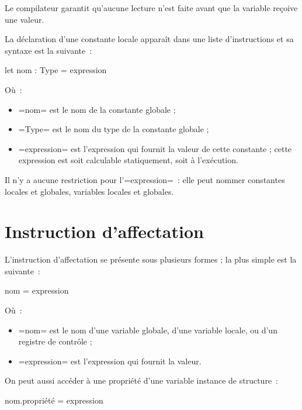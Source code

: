 Le compilateur garantit qu'aucune lecture n'est faite avant que la variable reçoive une valeur.











La déclaration d'une constante locale apparaît dans une liste d'instructions et sa syntaxe est la suivante~:

\begin{OMNIBUS}
let nom : Type = expression
\end{OMNIBUS}

Où~:
\begin{itemize}
  \item \omnibus=nom= est le nom de la constante globale ;
  \item \omnibus=Type= est le nom du type de la constante globale ;
  \item \omnibus=expression= est l'expression qui fournit la valeur de cette constante ; cette expression est soit calculable statiquement, soit à l'exécution.
\end{itemize}

Il n'y a aucune restriction pour l'\omnibus=expression=~: elle peut nommer constantes locales et globales, variables locales et globales.






\section {Instruction d'affectation}

L'instruction d'affectation se présente sous plusieurs formes ; la plus simple est la suivante~:

\begin{OMNIBUS}
nom = expression
\end{OMNIBUS}

Où~:
\begin{itemize}
  \item \omnibus=nom= est le nom d'une variable globale, d'une variable locale, ou d'un registre de contrôle ;
  \item \omnibus=expression= est l'expression qui fournit la valeur.
\end{itemize}

On peut aussi accéder à une propriété d'une variable instance de structure~:
\begin{OMNIBUS}
nom.propriété = expression
\end{OMNIBUS}

